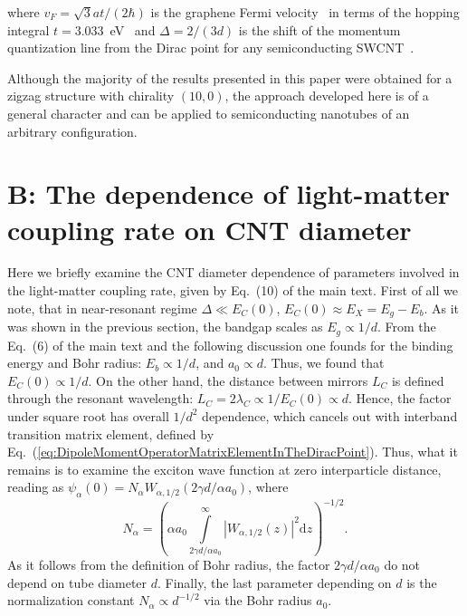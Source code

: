 \documentclass[journal=aamick,manuscript=article]{achemso}
\begin{document}
\noindent where $v_F = \sqrt{3} a t /(2 \hbar)$ is the graphene Fermi velocity~\cite{Neto2009} in terms of the hopping integral $t=3.033$~eV~\cite{SaitoBook1998} and $\Delta=2/(3d)$ is the shift of the momentum quantization line from the Dirac point for any semiconducting SWCNT~\cite{Saito2000,Samsonidze2003}. %

Although the majority of the results presented in this paper were obtained for a zigzag structure with chirality $(10,0)$, the approach developed here is of a general character and can be applied to semiconducting nanotubes of an arbitrary configuration.  


\section*{B: The dependence of light-matter coupling rate on CNT diameter}
\label{g-d-Dep}
Here we briefly examine the CNT diameter dependence of parameters involved in the light-matter coupling rate, given by Eq.~(10) of the main text. First of all we note, that in near-resonant regime $\Delta\ll E_C(0)$, $E_C(0) \approx E_X =E_g -E_b$. As it was shown in the previous section, the bandgap scales as $E_g \propto 1/d$. From the Eq.~(6) of the main text and the following discussion one founds for the binding energy and Bohr radius: $E_b\propto 1/d$, and $a_0 \propto d$. Thus, we found that $E_C(0)\propto 1/d$. On the other hand, the distance between mirrors $L_C$ is defined through the resonant wavelength: $L_C=2\lambda_C\propto1/E_C(0)\propto d$. Hence, the factor under square root has overall $1/d^2$ dependence, which cancels out with interband transition matrix element, defined by Eq.~(\ref{eq:DipoleMomentOperatorMatrixElementInTheDiracPoint}). Thus, what it remains is to examine the exciton wave function at zero interparticle distance, reading as $\psi_{\alpha}(0) = N_{\alpha} W_{\alpha,1/2}(2\gamma d/\alpha a_0)$, where
%
\begin{equation}
    N_{\alpha}=\left( \alpha a_0 \int\limits_{2\gamma d/\alpha a_0}^\infty |W_{\alpha,1/2}(z)|^2 \mathrm{d} z \right) ^{-1/2}. 
\end{equation}
%
As it follows from the definition of Bohr radius, the factor $2\gamma d/\alpha a_0$ do not depend on tube diameter $d$. Finally, the last parameter depending on $d$ is the normalization constant $N_\alpha \propto d^{-1/2}$ via the Bohr radius $a_0$. 
\end{document}
